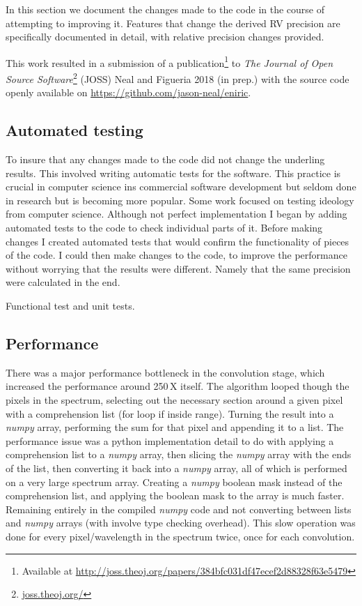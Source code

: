 In this section we document the changes made to the code in the course of attempting to improving it.
Features that change the derived {RV} precision are specifically documented in detail, with relative precision changes provided.

This work resulted in a submission of a publication\footnote{Available at \href{http://joss.theoj.org/papers/384bfc031df47ecef2d88328f63e5479}{http://joss.theoj.org/papers/384bfc031df47ecef2d88328f63e5479}} to \emph{The Journal of Open Source Software}\footnote{\href{http://joss.theoj.org/}{joss.theoj.org/}} (JOSS) {Neal and Figueria 2018 (in prep.)} with the source code openly available on \href{Github}{https://github.com/jason-neal/eniric}.


\subsection{Automated testing}
To insure that any changes made to the code did not change the underling results.
This involved writing automatic tests for the software.
This practice is crucial in computer science ins commercial software development but seldom done in research but is becoming more popular. 
Some work focused on testing ideology from computer science.
Although not perfect implementation I began by adding automated tests to the code to check individual parts of it.
Before making changes I created automated tests that would confirm the functionality of pieces of the code.
I could then make changes to the code, to improve the performance without worrying that the results were different.
Namely that the same precision were calculated in the end.

Functional test and unit tests.


\subsection{Performance}
\label{subsec:code_performance}
There was a major performance bottleneck in the convolution stage, which increased the performance around 250\,X itself.
The algorithm looped though the pixels in the spectrum, selecting out the necessary section around a given pixel with a comprehension list (for loop if inside range).
Turning the result into a \emph{numpy} array, performing the sum for that pixel and appending it to a list.
The performance issue was a python implementation detail to do with applying a comprehension list to a \emph{numpy} array, then slicing the \emph{numpy} array with the ends of the list, then converting it back into a \emph{numpy} array, all of which is performed on a very large spectrum array.
Creating a \emph{numpy} boolean mask instead of the comprehension list, and applying the boolean mask to the array is much faster.
Remaining entirely in the compiled \emph{numpy} code and not converting between lists and \emph{numpy} arrays (with involve type checking overhead).
This slow operation was done for every pixel/wavelength in the spectrum twice, once for each convolution.

